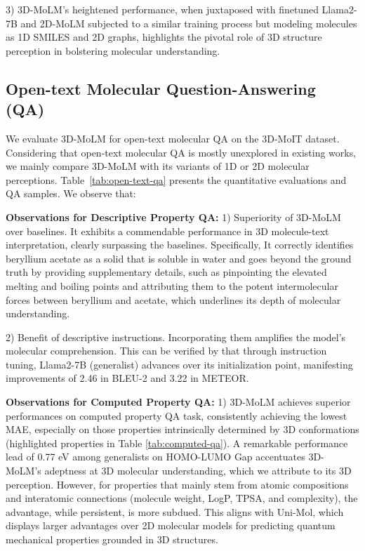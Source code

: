 3) 3D-MoLM's heightened performance, when juxtaposed with finetuned Llama2-7B and 2D-MoLM subjected to a similar training process but modeling molecules as 1D SMILES and 2D graphs, highlights the pivotal role of 3D structure perception in bolstering molecular understanding.

\subsection{Open-text Molecular Question-Answering (QA)}\label{sec:open-text-qa}

We evaluate 3D-MoLM for open-text molecular QA on the 3D-MoIT dataset. 
Considering that open-text molecular QA is mostly unexplored in existing works, we mainly compare 3D-MoLM with its variants of 1D or 2D molecular perceptions.  Table~\ref{tab:open-text-qa} presents the quantitative evaluations and QA samples. We observe that:

\textbf{Observations for Descriptive Property QA:} 1) Superiority of 3D-MoLM over baselines. 
It exhibits a commendable performance in 3D molecule-text interpretation, clearly surpassing the baselines. 
Specifically, It correctly identifies beryllium acetate as a solid that is soluble in water and goes beyond the ground truth by providing supplementary details, such as pinpointing the elevated melting and boiling points and attributing them to the potent intermolecular forces between beryllium and acetate, which underlines its depth of molecular understanding.

2) Benefit of descriptive instructions. 
Incorporating them amplifies the model's molecular comprehension. 
This can be verified by that through instruction tuning, Llama2-7B (generalist) advances over its initialization point, manifesting improvements of 2.46 in BLEU-2 and 3.22 in METEOR.

\textbf{Observations for Computed Property QA:} 1) 3D-MoLM achieves superior performances on computed property QA task, consistently achieving the lowest MAE, especially on those properties intrinsically determined by 3D conformations (\ie highlighted properties in Table \ref{tab:computed-qa}).
A remarkable performance lead of 0.77 eV among generalists on HOMO-LUMO Gap accentuates 3D-MoLM's adeptness at 3D molecular understanding, which we attribute to its 3D perception. 
However, for properties that mainly stem from atomic compositions and interatomic connections (\ie molecule weight, LogP, TPSA, and complexity), the advantage, while persistent, is more subdued. 
This aligns with Uni-Mol, which displays larger advantages over 2D molecular models for predicting quantum mechanical properties grounded in 3D structures.


